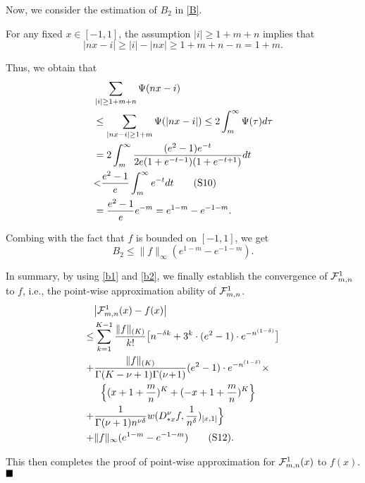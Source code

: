 \documentclass[journal]{IEEEtran}
\begin{document}
{Now, we consider the estimation of $B_{2}$ in \eqref{B}.

For any fixed $x\in[-1,1]$, the assumption $|i|\geq1+ m+n$ implies that  
\begin{equation}
    |nx-i|\geq |i|-|nx|\geq 1+m+n-n=1+m.\tag{S9}
\end{equation}


Thus, we obtain that
\begin{align}\label{sum_i_large_2}
&\sum\limits_{|i|\geq 1+m+n}\Psi(nx-i)\notag\\
    &\leq \sum\limits_{|nx-i|\geq 1+m}\Psi(|nx-i|)\leq 2\int_{m}^{\infty}\Psi(\tau)d\tau\notag\\
    &=2\int_{m}^{\infty}\frac{(e^{2}-1)e^{-t}}{2e(1+e^{-t-1})(1+e^{-t+1})}dt\notag\\
    &{\color{black}<}  \frac{e^{2}-1}{e}\int_{m}^{\infty}e^{-t}dt\tag{S10}\\
    &=\frac{e^{2}-1}{e}e^{-m}=e^{1-m}-e^{-1-m}.\notag
\end{align}
 
Combing with the fact that $f$ is bounded on $[-1,1]$, we get
\begin{equation}\label{b2}
B_{2}\leq \|f\|_{\infty}(e^{1-m}-e^{-1-m}).\tag{S11}
\end{equation}

In summary, by using  \eqref{b1} and \eqref{b2}, we finally establish the convergence of $\mathcal{F}_{m,n}^{{\color{black}1}}$ to $f$, i.e., the point-wise approximation ability of  $\mathcal{F}_{m,n}^{{\color{black}1}}$.
\begin{align*}
&\big|\mathcal{F}_{m,n}^{{\color{black}1}}(x)-f(x)\big|\\
\leq&\sum\limits_{k=1}^{K-1}\frac{\|f\|_{(K)}}{k!}\big[{n^{-\delta k}}
+3^{k}\cdot(e^{2}-1)\cdot e^{-n^{(1-\delta)}}\big]\\
+&\frac{\|f\|_{(K)}}{\Gamma(K-\nu+1)\Gamma(\nu\!+\!1)}{(e^{2}-1)}\cdot e^{-n^{(1-\delta)}}\times\\
&~~\Big\{
(x+1+\frac{m}{n})^{K}+(-x+1+\frac{m}{n})^{K}\Big\}\\
+&\frac{1}{\Gamma(\nu+1)n^{\nu\delta}}
w(D_{*x}^{\nu}f,\frac{1}{n^{\delta}})_{[x,1]}\Big\}
\\
+&\|f\|_{\infty}(e^{1-m}-e^{-1-m})\tag{S12}.
\end{align*} 

This then completes the proof of point-wise approximation for $\mathcal{F}_{m,n}^{{\color{black}1}}(x)$ to $f(x)$.
$\hfill\blacksquare$ 

}
\end{document}
